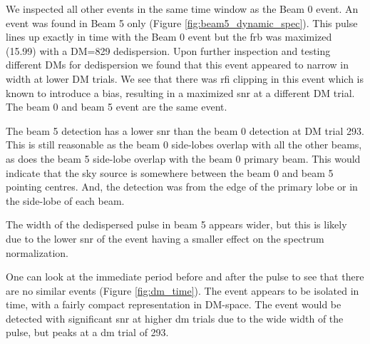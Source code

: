 \documentclass[a4paper,fleqn,usenatbib]{mnras}
\begin{document}
We inspected all other events in the same time window as the Beam 0 event. An
event was found in Beam 5 only (Figure \ref{fig:beam5_dynamic_spec}). This pulse
lines up exactly in time with the Beam 0 event but the \gls{frb} was maximized
(15.99) with a DM=829 dedispersion. Upon further inspection and testing
different DMs for dedispersion we found that this event appeared to narrow in
width at lower DM trials. We see that there was \gls{rfi} clipping in this event
which is known to introduce a bias, resulting in a maximized \gls{snr} at a
different DM trial. The beam 0 and beam 5 event are the same event.

The beam 5 detection has a lower \gls{snr} than the beam 0 detection at DM trial
293. This is still reasonable as the beam 0 side-lobes overlap with all the other
beams, as does the beam 5 side-lobe overlap with the beam 0 primary beam. This
would indicate that the sky source is somewhere between the beam 0 and beam 5
pointing centres. And, the detection was from the edge of the primary lobe or in
the side-lobe of each beam.

The width of the dedispersed pulse in beam 5 appears wider, but this is likely
due to the lower \gls{snr} of the event having a smaller effect on the
spectrum normalization.

One can look at the immediate period before and after the pulse to see that
there are no similar events (Figure \ref{fig:dm_time}). The event appears to be
isolated in time, with a fairly compact representation in DM-space. The event
would be detected with significant \gls{snr} at higher \gls{dm} trials due to
the wide width of the pulse, but peaks at a \gls{dm} trial of 293.
\end{document}

